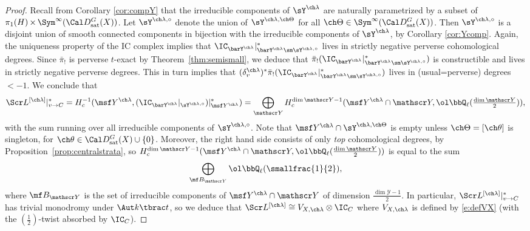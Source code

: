 \documentclass[final]{amsart}
\theoremstyle{remark}
\theoremstyle{definition}
\DeclareMathOperator*{\xt}{\times}
\numberwithin{equation}{section}
\begin{document}
\begin{proof}
Recall from Corollary \ref{cor:compY} that the irreducible components of $\sY^{\ch\lambda}$ are naturally parametrized by a subset of $\pi_1(H) \xt \Sym^\infty(\Cal D^G_{\mathrm{sat}}(X))$. 
Let $\sY^{\ch\lambda,\circ}$ denote the union of $\sY^{\ch\lambda,\ch\Theta}$ 
for all $\ch\Theta \in \Sym^\infty(\Cal D^G_{\mathrm{sat}}(X))$. 
Then $\sY^{\ch\lambda,\circ}$ is a disjoint union of smooth connected components
in bijection with the irreducible components of $\sY^{\ch\lambda}$, by Corollary \ref{cor:Ycomp}.   
Again, the uniqueness property of the IC complex implies that
$\IC_{\barY^{\ch\lambda}}|^*_{\barY^{\ch\lambda}\sm \sY^{\ch\lambda,\circ}}$ 
lives in strictly negative perverse cohomological degrees. 
Since $\bar\pi_!$ is perverse $t$-exact by Theorem~\ref{thm:semismall}, we
deduce that 
$\bar\pi_!( \IC_{\barY^{\ch\lambda}}|^*_{\barY^{\ch\lambda}\sm \sY^{\ch\lambda,\circ}} )$ 
is constructible and lives in strictly negative perverse degrees. 
This in turn implies that $(\delta^{\ch\lambda}_v)^* \bar\pi_!( \IC_{\barY^{\ch\lambda}}|^*_{\barY^{\ch\lambda}\sm \sY^{\ch\lambda,\circ}} )$ lives in (usual=perverse) degrees $<-1$. 
We conclude that 
\[
    \Scr L^{[\ch\lambda]}|^*_{v\to C} = 
    H^{-1}_c(\msf Y^{\ch\lambda}, (\IC_{\barY^{\ch\lambda}}|_{\sY^{\ch\lambda,\circ}})|^*_{\msf Y^{\ch\lambda}} ) = 
\bigoplus_{\mathscr Y} H_c^{\dim \mathscr Y - 1}(\msf Y^{\ch\lambda} \cap \mathscr Y, \ol\bbQ_\ell({\textstyle \frac{\dim \mathscr Y}{2}})),\]
with the sum running over all irreducible components of $\sY^{\ch\lambda,\circ}$.
Note that $\msf Y^{\ch\lambda}\cap \sY^{\ch\lambda,\ch\Theta}$ is empty unless 
$\ch\Theta = [\ch\theta]$ is singleton, for $\ch\theta \in \Cal D^G_{\mathrm{sat}}(X) \cup \{0\}$. 
Moreover, the right hand side consists of only \emph{top} cohomological degrees, by Proposition~\ref{prop:centralstrata}, so 
$H_c^{\dim \mathscr Y - 1}(\msf Y^{\ch\lambda} \cap \mathscr Y, \ol\bbQ_\ell (\frac{\dim \mathscr Y}{2}))$ 
is equal to the sum 
\[\bigoplus_{\mf B_{\mathscr Y}} \ol\bbQ_\ell(\smallfrac{1}{2}),\]
where $\mf B_{\mathscr Y}$ is the set of irreducible components of $\msf Y^{\ch\lambda}\cap \mathscr Y$ of dimension $\frac{\dim \mathscr Y - 1}{2}$.  
In particular, $\Scr L^{[\ch\lambda]}|^*_{v\to C}$ has trivial monodromy under $\Aut k\tbrac t$, 
so we  deduce that $\Scr L^{[\ch\lambda]} \cong V_{X,\ch\lambda} \otimes 
\IC_C$ where $V_{X,\ch\lambda}$ is defined by \eqref{e:defVX} (with the $(\frac{1}{2})$-twist absorbed by $\IC_C$). 


\end{proof}
\end{document}
